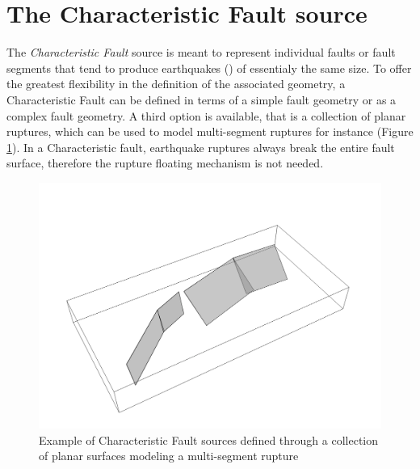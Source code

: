 \section{The Characteristic Fault source}
The \textit{Characteristic Fault} source is meant to represent individual faults or fault segments that tend to
produce earthquakes (\cite{schwartscoppersmith1984}) of essentialy the same size. To offer the greatest flexibility
in the definition of the associated geometry, a Characteristic Fault can be defined in terms of a simple fault
geometry or as a complex fault geometry. A third option is available, that is a collection of planar ruptures,
which can be used to model multi-segment ruptures for instance (Figure \ref{fig:CharacteristicFaultSource}). In a Characteristic fault, earthquake ruptures
always break the entire fault surface, therefore the rupture floating mechanism is not needed.
\begin{figure}
\centering
\includegraphics[width=14cm]{./Pictures/CharacteristicFaultSource.pdf}
\caption{Example of Characteristic Fault sources defined through a collection of planar surfaces modeling a multi-segment rupture}
\label{fig:CharacteristicFaultSource}
\end{figure}
%
%
%


